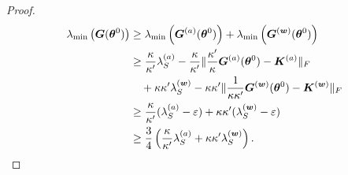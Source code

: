 \documentclass{article}
\begin{document}
\begin{proof}
    \begin{equation}
        \begin{aligned}
            \lambda_{\min}\left(\bm{G}(\bm{\theta}^0)\right)
             & \geq\lambda_{\min}\left(\bm{G}^{(a)}(\bm{\theta}^0)\right) + \lambda_{\min}\left(\bm{G}^{(\bm{w})}(\bm{\theta}^0)\right)                          \\
             & \geq\frac{\kappa}{\kappa'}\lambda_S^{(a)}-\frac{\kappa}{\kappa'} \lVert\frac{\kappa'}{\kappa}\bm{G}^{(a)}(\bm{\theta}^0) - \bm{K}^{(a)}\rVert_F \\
             & \quad + \kappa\kappa'\lambda_S^{(\bm{w})} - \kappa\kappa'\lVert\frac{1}{\kappa\kappa'}\bm{G}^{(\bm{w})}(\bm{\theta}^0) - \bm{K}^{(\bm{w})}\rVert_F       \\
             & \geq\frac{\kappa}{\kappa'}(\lambda_S^{(a)}-\varepsilon)+\kappa\kappa'(\lambda_S^{(\bm{w})}-\varepsilon)                                           \\
             & \geq\frac{3}{4}\left(\frac{\kappa}{\kappa'}\lambda_S^{(a)}+\kappa\kappa'\lambda_S^{(\bm{w})}\right).
        \end{aligned}
    \end{equation}
\end{proof}
\end{document}
